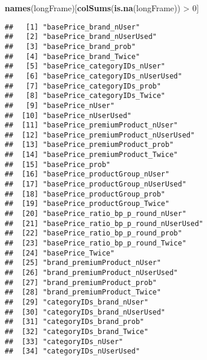 \documentclass[10pt]{report}
\newenvironment{Shaded}{}{}
\newcommand{\KeywordTok}[1]{\textcolor[rgb]{0.00,0.44,0.13}{\textbf{{#1}}}}
\newcommand{\DecValTok}[1]{\textcolor[rgb]{0.25,0.63,0.44}{{#1}}}
\newcommand{\StringTok}[1]{\textcolor[rgb]{0.25,0.44,0.63}{{#1}}}
\newcommand{\NormalTok}[1]{{#1}}
\begin{document}
\begin{Shaded}
\begin{Highlighting}[]
\KeywordTok{names}\NormalTok{(longFrame)[}\KeywordTok{colSums}\NormalTok{(}\KeywordTok{is.na}\NormalTok{(longFrame)) >}\StringTok{ }\DecValTok{0}\NormalTok{]}
\end{Highlighting}
\end{Shaded}

\begin{verbatim}
##   [1] "basePrice_brand_nUser"                              
##   [2] "basePrice_brand_nUserUsed"                          
##   [3] "basePrice_brand_prob"                               
##   [4] "basePrice_brand_Twice"                              
##   [5] "basePrice_categoryIDs_nUser"                        
##   [6] "basePrice_categoryIDs_nUserUsed"                    
##   [7] "basePrice_categoryIDs_prob"                         
##   [8] "basePrice_categoryIDs_Twice"                        
##   [9] "basePrice_nUser"                                    
##  [10] "basePrice_nUserUsed"                                
##  [11] "basePrice_premiumProduct_nUser"                     
##  [12] "basePrice_premiumProduct_nUserUsed"                 
##  [13] "basePrice_premiumProduct_prob"                      
##  [14] "basePrice_premiumProduct_Twice"                     
##  [15] "basePrice_prob"                                     
##  [16] "basePrice_productGroup_nUser"                       
##  [17] "basePrice_productGroup_nUserUsed"                   
##  [18] "basePrice_productGroup_prob"                        
##  [19] "basePrice_productGroup_Twice"                       
##  [20] "basePrice_ratio_bp_p_round_nUser"                   
##  [21] "basePrice_ratio_bp_p_round_nUserUsed"               
##  [22] "basePrice_ratio_bp_p_round_prob"                    
##  [23] "basePrice_ratio_bp_p_round_Twice"                   
##  [24] "basePrice_Twice"                                    
##  [25] "brand_premiumProduct_nUser"                         
##  [26] "brand_premiumProduct_nUserUsed"                     
##  [27] "brand_premiumProduct_prob"                          
##  [28] "brand_premiumProduct_Twice"                         
##  [29] "categoryIDs_brand_nUser"                            
##  [30] "categoryIDs_brand_nUserUsed"                        
##  [31] "categoryIDs_brand_prob"                             
##  [32] "categoryIDs_brand_Twice"                            
##  [33] "categoryIDs_nUser"                                  
##  [34] "categoryIDs_nUserUsed"                              

\end{verbatim}
\end{document}
